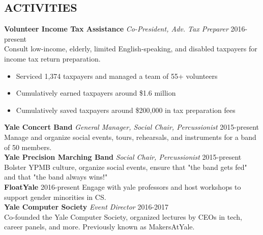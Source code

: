 \documentclass[margin, centered]{res}
\begin{document}
\begin{resume}
  \section{ACTIVITIES}
  \textbf{Volunteer Income Tax Assistance} \textit{Co-President, Adv. Tax Preparer} \hfill 2016-present \\
  Consult low-income, elderly, limited English-speaking, and disabled taxpayers for income tax return preparation.
  \begin{itemize}
    \item Serviced 1,374 taxpayers and managed a team of 55+ volunteers
    \item Cumulatively earned taxpayers around \$1.6 million
    \item Cumulatively saved taxpayers around \$200,000 in tax preparation fees
  \end{itemize}
  \textbf{Yale Concert Band} \textit{General Manager, Social Chair, Percussionist} \hfill 2015-present
  Manage and organize social events, tours, rehearsals, and instruments for a band of 50 members. \\ 
  \textbf{Yale Precision Marching Band} \textit{Social Chair, Percussionist} \hfill 2015-present
  Bolster YPMB culture, organize social events, ensure that "the band gets fed" and that "the band always wins!" \\ 
  \textbf{FloatYale} \hfill 2016-present
  Engage with yale professors and host workshops to support gender minorities in CS. \\ 
  \textbf{Yale Computer Society} \textit{Event Director} \hfill 2016-2017 \\
  Co-founded the Yale Computer Society, organized lectures by CEOs in tech, career panels, and more. Previously known as MakersAtYale. 

\end{resume}
\end{document}
